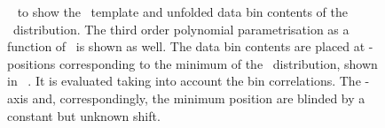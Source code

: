 \begin{figure}[tbp!]
{  \label{sfig:bin3}
}
\hfill
{}
\caption[\chiq\ fit to the unfolded distribution]{
%
~ to  show the \truelevel\ template and unfolded data bin contents of the \mlb\ distribution. 
%
The third order polynomial parametrisation as a function of \mt\ is shown as well.
%
The data bin contents are placed at \mt-positions corresponding to the minimum of the \chiq\ distribution, shown in \fig~.
%
It is evaluated taking into account the bin correlations. The \mt-axis and, correspondingly, the minimum position are blinded by a constant but unknown shift.
%
\label{fig:unfoldfit}
}
\end{figure}













